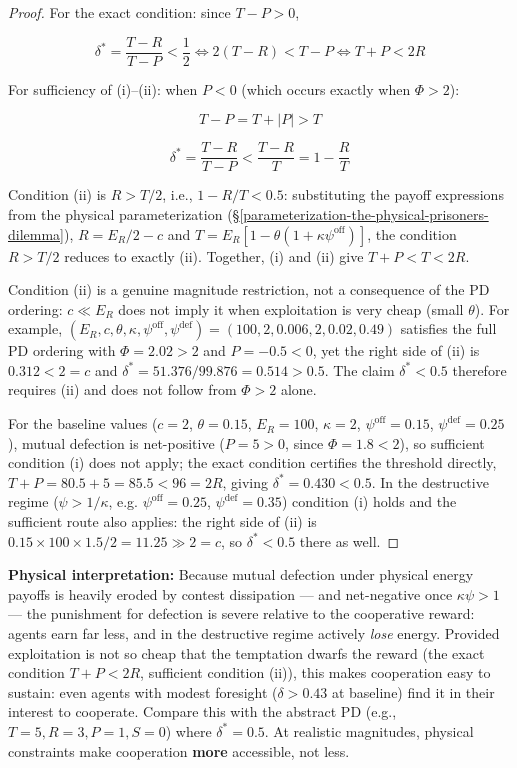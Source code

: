 \documentclass[11pt]{article}
\theoremstyle{plain}
\theoremstyle{definition}
\theoremstyle{remark}
\begin{document}
\begin{proof}
For the exact condition: since $T - P > 0$,

$$\delta^* = \frac{T - R}{T - P} < \frac{1}{2} \iff 2(T - R) < T - P \iff T + P < 2R$$

For sufficiency of (i)–(ii): when $P < 0$ (which occurs exactly when $\Phi > 2$):

$$T - P = T + |P| > T$$

$$\delta^* = \frac{T - R}{T - P} < \frac{T - R}{T} = 1 - \frac{R}{T}$$

Condition (ii) is $R > T/2$, i.e., $1 - R/T < 0.5$: substituting the payoff expressions from the physical parameterization (§\ref{parameterization-the-physical-prisoners-dilemma}), $R = E_R/2 - c$ and $T = E_R[1 - \theta(1 + \kappa\psi^{\text{off}})]$, the condition $R > T/2$ reduces to exactly (ii). Together, (i) and (ii) give $T + P < T < 2R$.

Condition (ii) is a genuine magnitude restriction, not a consequence of the PD ordering: $c \ll E_R$ does not imply it when exploitation is very cheap (small $\theta$). For example, $(E_R, c, \theta, \kappa, \psi^{\text{off}}, \psi^{\text{def}}) = (100, 2, 0.006, 2, 0.02, 0.49)$ satisfies the full PD ordering with $\Phi = 2.02 > 2$ and $P = -0.5 < 0$, yet the right side of (ii) is $0.312 < 2 = c$ and $\delta^* = 51.376/99.876 = 0.514 > 0.5$. The claim $\delta^* < 0.5$ therefore requires (ii) and does not follow from $\Phi > 2$ alone.

For the baseline values ($c = 2$, $\theta = 0.15$, $E_R = 100$, $\kappa = 2$, $\psi^{\text{off}} = 0.15$, $\psi^{\text{def}} = 0.25$), mutual defection is net-positive ($P = 5 > 0$, since $\Phi = 1.8 < 2$), so sufficient condition (i) does not apply; the exact condition certifies the threshold directly, $T + P = 80.5 + 5 = 85.5 < 96 = 2R$, giving $\delta^* = 0.430 < 0.5$. In the destructive regime ($\psi > 1/\kappa$, e.g. $\psi^{\text{off}} = 0.25$, $\psi^{\text{def}} = 0.35$) condition (i) holds and the sufficient route also applies: the right side of (ii) is $0.15 \times 100 \times 1.5 / 2 = 11.25 \gg 2 = c$, so $\delta^* < 0.5$ there as well.
\end{proof}

\textbf{Physical interpretation:} Because mutual defection under
physical energy payoffs is heavily eroded by contest dissipation --- and
net-negative once \(\kappa\psi > 1\) --- the punishment for defection is
severe relative to the cooperative reward: agents earn far less, and in
the destructive regime actively \emph{lose} energy. Provided
exploitation is not so cheap that the temptation dwarfs the reward (the
exact condition \(T + P < 2R\), sufficient condition (ii)), this makes
cooperation easy to sustain: even agents with modest foresight
(\(\delta > 0.43\) at baseline) find it in their interest to cooperate.
Compare this with the abstract PD (e.g., \(T=5, R=3, P=1, S=0\)) where
\(\delta^* = 0.5\). At realistic magnitudes, physical constraints make
cooperation \textbf{more} accessible, not less.
\end{document}
